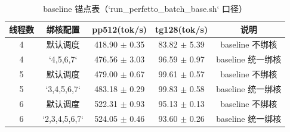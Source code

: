 \begin{table}[ht]
  \centering
  \caption{baseline 锚点表（`run_perfetto_batch_base.sh` 口径）}
  \label{tab:baseline-anchor}
  \begin{tabular}{c c c c c}
    \hline
    线程数 & 绑核配置 & pp512(tok/s) & tg128(tok/s) & 说明 \\
    \hline
    4 & 默认调度 & 418.90 $\pm$ 0.35 & 83.82 $\pm$ 5.39 & baseline 不绑核 \\
    4 & `4,5,6,7` & 476.56 $\pm$ 3.03 & 96.59 $\pm$ 0.97 & baseline 统一绑核 \\
    5 & 默认调度 & 479.00 $\pm$ 0.67 & 99.61 $\pm$ 0.57 & baseline 不绑核 \\
    5 & `3,4,5,6,7` & 483.18 $\pm$ 0.29 & 99.83 $\pm$ 0.58 & baseline 统一绑核 \\
    6 & 默认调度 & 522.31 $\pm$ 0.93 & 95.13 $\pm$ 0.13 & baseline 不绑核 \\
    6 & `2,3,4,5,6,7` & 524.05 $\pm$ 0.46 & 93.60 $\pm$ 0.26 & baseline 统一绑核 \\
    \hline
  \end{tabular}
\end{table}
